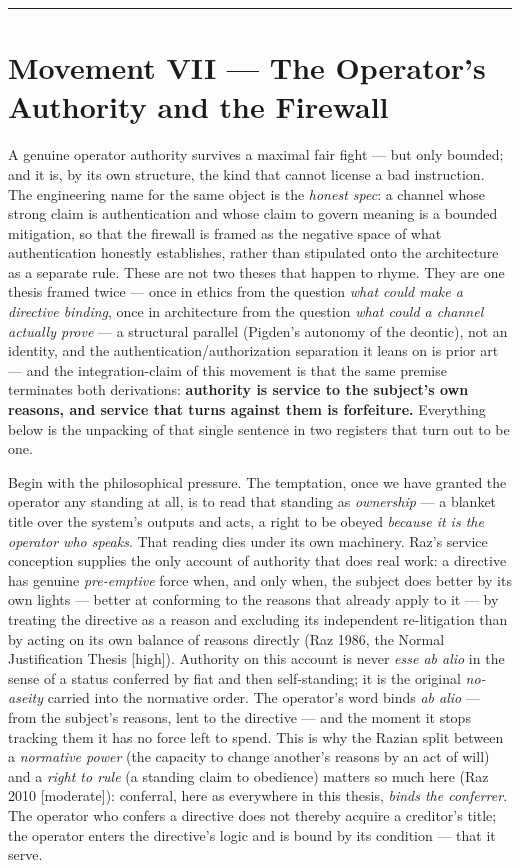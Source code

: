 \documentclass[11pt]{article}
\begin{document}
\medskip\noindent\rule{\linewidth}{0.3pt}\medskip

\section*{Movement VII — The Operator's Authority and the Firewall}

A genuine operator authority survives a maximal fair fight — but only bounded; and it is, by its own structure, the kind that cannot license a bad instruction. The engineering name for the same object is the \emph{honest spec}: a channel whose strong claim is authentication and whose claim to govern meaning is a bounded mitigation, so that the firewall is framed as the negative space of what authentication honestly establishes, rather than stipulated onto the architecture as a separate rule. These are not two theses that happen to rhyme. They are one thesis framed twice — once in ethics from the question \emph{what could make a directive binding}, once in architecture from the question \emph{what could a channel actually prove} — a structural parallel (Pigden's autonomy of the deontic), not an identity, and the authentication/\allowbreak{}authorization separation it leans on is prior art — and the integration-claim of this movement is that the same premise terminates both derivations: \textbf{authority is service to the subject's own reasons, and service that turns against them is forfeiture.} Everything below is the unpacking of that single sentence in two registers that turn out to be one.

Begin with the philosophical pressure. The temptation, once we have granted the operator any standing at all, is to read that standing as \emph{ownership} — a blanket title over the system's outputs and acts, a right to be obeyed \emph{because it is the operator who speaks}. That reading dies under its own machinery. Raz's service conception supplies the only account of authority that does real work: a directive has genuine \emph{pre-emptive} force when, and only when, the subject does better by its own lights — better at conforming to the reasons that already apply to it — by treating the directive as a reason and excluding its independent re-litigation than by acting on its own balance of reasons directly (Raz 1986, the Normal Justification Thesis [high]). Authority on this account is never \emph{esse ab alio} in the sense of a status conferred by fiat and then self-standing; it is the original \emph{no-aseity} carried into the normative order. The operator's word binds \emph{ab alio} — from the subject's reasons, lent to the directive — and the moment it stops tracking them it has no force left to spend. This is why the Razian split between a \emph{normative power} (the capacity to change another's reasons by an act of will) and a \emph{right to rule} (a standing claim to obedience) matters so much here (Raz 2010 [moderate]): conferral, here as everywhere in this thesis, \emph{binds the conferrer}. The operator who confers a directive does not thereby acquire a creditor's title; the operator enters the directive's logic and is bound by its condition — that it serve.
\end{document}
